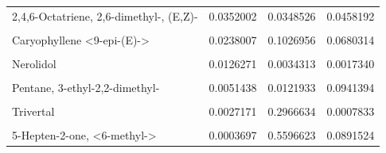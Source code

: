 \documentclass{ufdissertation}[overrideChapters] %
\begin{document}
{\begin{table}
{\begin{tabular}[t]{lrrr}
2,4,6-Octatriene, 2,6-dimethyl-, (E,Z)- & 0.0352002 & 0.0348526 & 0.0458192\\
\cellcolor{gray!6}{Calamenene} & \cellcolor{gray!6}{0.0292478} & \cellcolor{gray!6}{0.1013612} & \cellcolor{gray!6}{0.3343829}\\
Caryophyllene <9-epi-(E)-> & 0.0238007 & 0.1026956 & 0.0680314\\
\addlinespace
\cellcolor{gray!6}{Ocimene, <trans-beta->} & \cellcolor{gray!6}{0.0200925} & \cellcolor{gray!6}{0.0135288} & \cellcolor{gray!6}{0.0222477}\\
Nerolidol & 0.0126271 & 0.0034313 & 0.0017340\\
\cellcolor{gray!6}{2-Hexen-1-ol, acetate, (E)-} & \cellcolor{gray!6}{0.0093561} & \cellcolor{gray!6}{0.0819047} & \cellcolor{gray!6}{0.0016911}\\
Pentane, 3-ethyl-2,2-dimethyl- & 0.0051438 & 0.0121933 & 0.0941394\\
\cellcolor{gray!6}{Myrcene <beta->} & \cellcolor{gray!6}{0.0029627} & \cellcolor{gray!6}{0.1348161} & \cellcolor{gray!6}{0.0120437}\\
\addlinespace
Trivertal & 0.0027171 & 0.2966634 & 0.0007833\\
\cellcolor{gray!6}{2-Thujene} & \cellcolor{gray!6}{0.0013261} & \cellcolor{gray!6}{0.0817092} & \cellcolor{gray!6}{0.0081560}\\
5-Hepten-2-one, <6-methyl-> & 0.0003697 & 0.5596623 & 0.0891524\\
\bottomrule
\end{tabular}}
\end{table}
\begin{table}


\end{table}}
\end{document}
